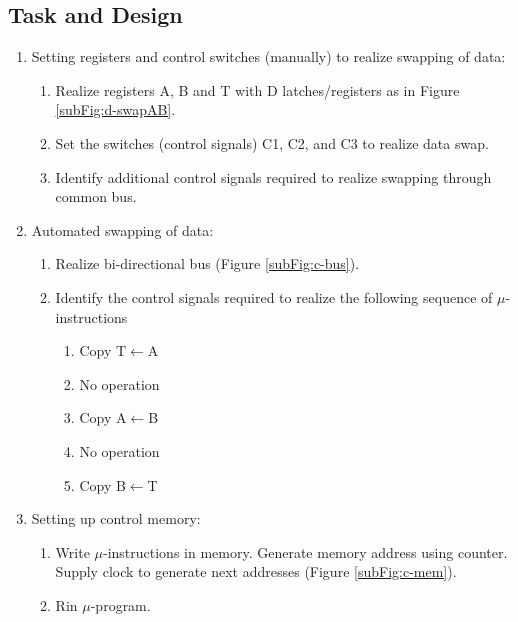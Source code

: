 \documentclass[a4paper]{article}
\begin{document}
\subsection{Task and Design}
\begin{enumerate}
    \item Setting registers and control switches (manually) to realize swapping of data:
    \begin{enumerate}
        \item Realize registers A, B and T with D latches/registers as in Figure \ref{subFig:d-swapAB}.
        \item Set the switches (control signals) C1, C2, and C3 to realize data swap.
        \item Identify additional control signals required to realize swapping through common bus.
    \end{enumerate}
    \item Automated swapping of data:
    \begin{enumerate}
        \item Realize bi-directional bus (Figure \ref{subFig:c-bus}).
        \item Identify the control signals required to realize the following sequence of $\mu$-instructions
        \begin{enumerate}
            \item Copy T$\leftarrow$A
            \item No operation
            \item Copy A$\leftarrow$B
            \item No operation
            \item Copy B$\leftarrow$T
        \end{enumerate}
    \end{enumerate}
    \item Setting up control memory:
    \begin{enumerate}
        \item Write $\mu$-instructions in memory. Generate memory address using counter. Supply clock to generate next addresses (Figure \ref{subFig:c-mem}).
        \item Rin $\mu$-program.
    \end{enumerate}
\end{enumerate}
\end{document}

